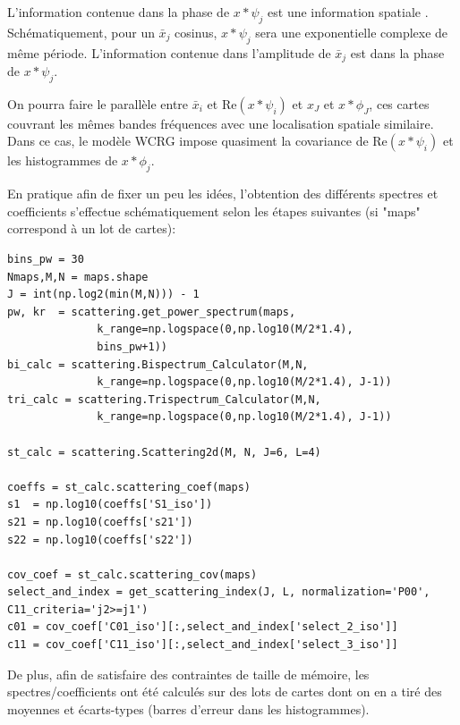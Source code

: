 \documentclass[12pt,twoside]{article}
\begin{document}
L'information contenue dans la phase de $x*\psi_j$ est une information spatiale \cite{dualtreewavelets}. Schématiquement, pour un $\bar x_j$ cosinus, $x*\psi_j$ sera une exponentielle complexe de même période. L'information contenue dans l'amplitude de $\bar x_j$ est dans la phase de $x*\psi_j$.


On pourra faire le parallèle entre $\bar x_i$ et $\text{Re}(x*\psi_i)$ et $x_J$ et $x*\phi_J$, ces cartes couvrant les mêmes bandes fréquences avec une localisation spatiale similaire.
Dans ce cas, le modèle WCRG impose quasiment la covariance de $\text{Re}(x*\psi_i)$ et les histogrammes de $x*\phi_j$.


En pratique afin de fixer un peu les idées, l'obtention des différents spectres et coefficients  s'effectue schématiquement selon les étapes suivantes (si "maps" correspond à un lot de cartes):
\begin{lstlisting}[language=iPython]
bins_pw = 30
Nmaps,M,N = maps.shape
J = int(np.log2(min(M,N))) - 1
pw, kr  = scattering.get_power_spectrum(maps,
              k_range=np.logspace(0,np.log10(M/2*1.4), 
              bins_pw+1))
bi_calc = scattering.Bispectrum_Calculator(M,N, 
              k_range=np.logspace(0,np.log10(M/2*1.4), J-1))
tri_calc = scattering.Trispectrum_Calculator(M,N,
              k_range=np.logspace(0,np.log10(M/2*1.4), J-1))

st_calc = scattering.Scattering2d(M, N, J=6, L=4)

coeffs = st_calc.scattering_coef(maps)
s1  = np.log10(coeffs['S1_iso'])
s21 = np.log10(coeffs['s21'])
s22 = np.log10(coeffs['s22'])

cov_coef = st_calc.scattering_cov(maps)
select_and_index = get_scattering_index(J, L, normalization='P00', C11_criteria='j2>=j1')
c01 = cov_coef['C01_iso'][:,select_and_index['select_2_iso']]
c11 = cov_coef['C11_iso'][:,select_and_index['select_3_iso']]
\end{lstlisting}
De plus, afin de satisfaire des contraintes de taille de mémoire, les spectres/coefficients ont été calculés sur des lots de cartes dont on en a tiré des moyennes et écarts-types (barres d'erreur dans les histogrammes).
\end{document}
